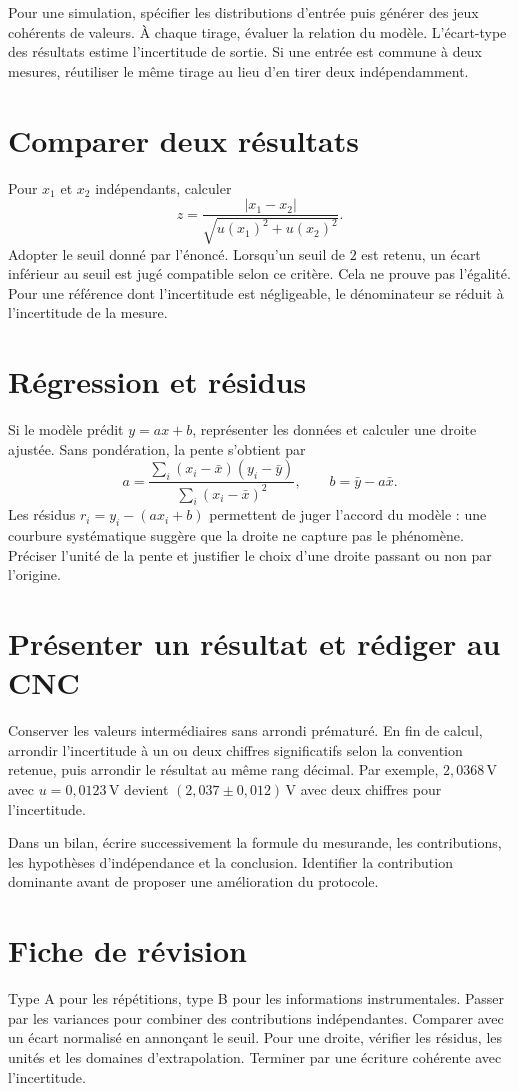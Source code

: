 \documentclass[11pt,a4paper]{article}
\begin{document}
Pour une simulation, spécifier les distributions d’entrée puis générer des jeux cohérents de valeurs. À chaque tirage, évaluer la relation du modèle. L’écart-type des résultats estime l’incertitude de sortie. Si une entrée est commune à deux mesures, réutiliser le même tirage au lieu d’en tirer deux indépendamment.

\section*{Comparer deux résultats}
Pour $x_1$ et $x_2$ indépendants, calculer
\[ z=\frac{|x_1-x_2|}{\sqrt{u(x_1)^2+u(x_2)^2}}. \]
Adopter le seuil donné par l’énoncé. Lorsqu’un seuil de $2$ est retenu, un écart inférieur au seuil est jugé compatible selon ce critère. Cela ne prouve pas l’égalité. Pour une référence dont l’incertitude est négligeable, le dénominateur se réduit à l’incertitude de la mesure.

\section*{Régression et résidus}
Si le modèle prédit $y=ax+b$, représenter les données et calculer une droite ajustée. Sans pondération, la pente s’obtient par
\[ a=\frac{\sum_i(x_i-\bar x)(y_i-\bar y)}{\sum_i(x_i-\bar x)^2},\qquad b=\bar y-a\bar x. \]
Les résidus $r_i=y_i-(ax_i+b)$ permettent de juger l’accord du modèle : une courbure systématique suggère que la droite ne capture pas le phénomène. Préciser l’unité de la pente et justifier le choix d’une droite passant ou non par l’origine.

\section*{Présenter un résultat et rédiger au CNC}
Conserver les valeurs intermédiaires sans arrondi prématuré. En fin de calcul, arrondir l’incertitude à un ou deux chiffres significatifs selon la convention retenue, puis arrondir le résultat au même rang décimal. Par exemple, $2{,}0368\,\mathrm V$ avec $u=0{,}0123\,\mathrm V$ devient $(2{,}037\pm0{,}012)\,\mathrm V$ avec deux chiffres pour l’incertitude.

Dans un bilan, écrire successivement la formule du mesurande, les contributions, les hypothèses d’indépendance et la conclusion. Identifier la contribution dominante avant de proposer une amélioration du protocole.

\section*{Fiche de révision}
Type A pour les répétitions, type B pour les informations instrumentales. Passer par les variances pour combiner des contributions indépendantes. Comparer avec un écart normalisé en annonçant le seuil. Pour une droite, vérifier les résidus, les unités et les domaines d’extrapolation. Terminer par une écriture cohérente avec l’incertitude.
\end{document}

